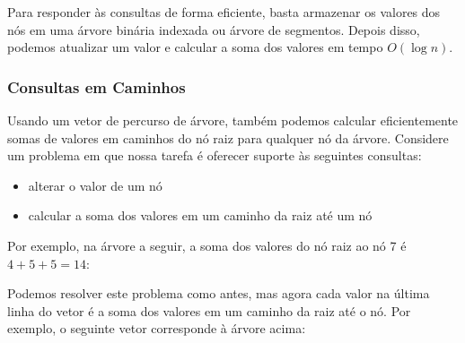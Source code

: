 Para responder às consultas de forma eficiente, basta armazenar os valores dos nós em uma árvore binária indexada ou árvore de segmentos. Depois disso, podemos atualizar um valor e calcular a soma dos valores em tempo $O(\log n)$.

\subsubsection{Consultas em Caminhos}

Usando um vetor de percurso de árvore, também podemos calcular eficientemente somas de valores em caminhos do nó raiz para qualquer nó da árvore. Considere um problema em que nossa tarefa é oferecer suporte às seguintes consultas:

\begin{itemize}
\item alterar o valor de um nó
\item calcular a soma dos valores em um caminho da raiz até um nó
\end{itemize}

Por exemplo, na árvore a seguir, a soma dos valores do nó raiz ao nó 7 é $4+5+5=14$:

\begin{center}
\end{center}

Podemos resolver este problema como antes, mas agora cada valor na última linha do vetor é a soma dos valores em um caminho da raiz até o nó. Por exemplo, o seguinte vetor corresponde à árvore acima:

